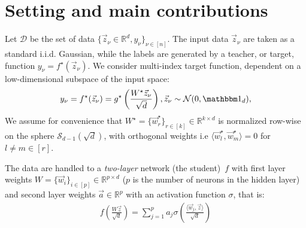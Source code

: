 \section{Setting and main contributions}
\label{2402:sec:main:setting}
 Let $\mathcal{D}$ be the set of data $\{\vec{z}_{\nu} \in {\mathbb R}^d, y_{\nu}\}_{\nu \in [n]}$. The input data $\vec{z}_{\nu}$ are taken as a standard i.i.d. Gaussian, while the labels are generated by a teacher, or target, function $y_\nu = f^\star(\vec z_\nu)$. We consider multi-index target function, dependent on a low-dimensional subspace of the input space:
\begin{align}
   y_\nu = f^\star(\vec z_\nu) = g^\star\left(\frac{W^\star \vec z_\nu}{\sqrt{d}}\right),  \vec z_\nu \sim {\cal N}(0,{\mathbbm 1}_d) ,
   \label{2402:eq:main:teacher_def}
\end{align}  We assume for convenience that $W^\star = \{\vec w^\star_r\}_{r \in [k]} \in \mathbb{R}^{k \times d}$ is normalized row-wise on the sphere $\mathcal{S}_{d-1}(\sqrt{d})$, with orthogonal weights i.e $\langle \vec w^\star_l,\vec w^\star_m \rangle = 0$ for $l \neq m \in [r]$. 

The data are handled to a {\it two-layer} network (the student)~$f$ with first layer weights $W = \{\vec w_i \}_{i \in [p]} \in \mathbb{R}^{p \times d}$ ($p$ is the number of neurons in the hidden layer) and second layer weights $\vec a \in \mathbb{R}^p$
with an activation function $\sigma$, that is:
\begin{align}
    f\left( \frac{W\vec z} {\sqrt{d}}\right) = \sum_{j=1}^p a_j \sigma{\left(\frac{\langle \vec w_j, \vec z \rangle}{ \sqrt{d}}\right)}
\end{align}

